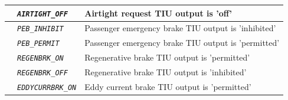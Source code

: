 \documentclass{template/openetcs}
\begin{document}
\begin{itemize}
\begin{longtable}{|l|l|l|}
			\hline

			&	\begin{minipage}[t]{0.40\linewidth} \emph{\texttt{AIRTIGHT\_OFF}} \end{minipage}
			&	\begin{minipage}[t]{0.38\linewidth} Airtight request TIU output is ’off’ \end{minipage} \\ 

			\hline

			&	\begin{minipage}[t]{0.40\linewidth} \emph{\texttt{PEB\_INHIBIT}} \end{minipage}
			&	\begin{minipage}[t]{0.38\linewidth} Passenger emergency brake TIU output is ’inhibited’ \end{minipage} \\ 

			\hline

			&	\begin{minipage}[t]{0.40\linewidth} \emph{\texttt{PEB\_PERMIT}} \end{minipage}
			&	\begin{minipage}[t]{0.38\linewidth} Passenger emergency brake TIU output is ’permitted’ \end{minipage} \\ 

			\hline

			&	\begin{minipage}[t]{0.40\linewidth} \emph{\texttt{REGENBRK\_ON}} \end{minipage}
			&	\begin{minipage}[t]{0.38\linewidth} Regenerative brake TIU output is ’permitted’ \end{minipage} \\ 

			\hline

			&	\begin{minipage}[t]{0.40\linewidth} \emph{\texttt{REGENBRK\_OFF}} \end{minipage}
			&	\begin{minipage}[t]{0.38\linewidth} Regenerative brake TIU output is ’inhibited’ \end{minipage} \\ 

			\hline

			&	\begin{minipage}[t]{0.40\linewidth} \emph{\texttt{EDDYCURRBRK\_ON}} \end{minipage}
			&	\begin{minipage}[t]{0.38\linewidth} Eddy current brake TIU output is ’permitted’ \end{minipage} \\ 


\end{longtable}
\end{itemize}
\end{document}
